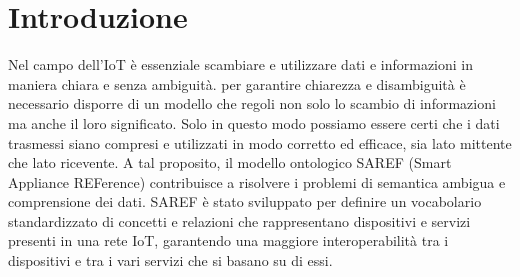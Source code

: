\chapter{Introduzione}

Nel campo dell’IoT è essenziale scambiare e utilizzare dati e informazioni in maniera chiara e senza ambiguità.
per garantire chiarezza e disambiguità è necessario disporre di un modello che regoli non solo lo scambio di informazioni ma anche il loro significato. Solo in questo modo possiamo essere certi che i dati trasmessi siano compresi e utilizzati in modo corretto ed efficace, sia lato mittente che lato ricevente.
A tal proposito, il modello ontologico SAREF (Smart Appliance REFerence) contribuisce a risolvere i problemi di semantica ambigua e comprensione dei dati. 
SAREF è stato sviluppato per definire un vocabolario standardizzato di concetti e relazioni che rappresentano dispositivi e servizi presenti in una rete IoT, garantendo una maggiore interoperabilità tra i dispositivi e tra i vari servizi che si basano su di essi.
